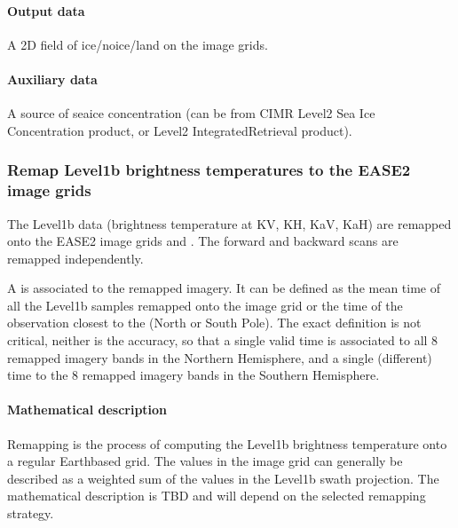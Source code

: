 \documentclass[letterpaper,10pt,english]{jupyterBook}
\begin{document}
\paragraph{Output data}
\label{\detokenize{baseline_algorithm_definition:output-data}}
\sphinxAtStartPar
A 2D field of ice/no\sphinxhyphen{}ice/land on the image grids.


\paragraph{Auxiliary data}
\label{\detokenize{baseline_algorithm_definition:auxiliary-data}}
\sphinxAtStartPar
A source of sea\sphinxhyphen{}ice concentration (can be from CIMR Level\sphinxhyphen{}2 Sea Ice Concentration product, or Level\sphinxhyphen{}2 Integrated\sphinxhyphen{}Retrieval product).


\subsubsection{Remap Level\sphinxhyphen{}1b brightness temperatures to the EASE2 image grids}
\label{\detokenize{baseline_algorithm_definition:remap-level-1b-brightness-temperatures-to-the-ease2-image-grids}}
\sphinxAtStartPar
The Level\sphinxhyphen{}1b data (brightness temperature at K\sphinxhyphen{}V, K\sphinxhyphen{}H, Ka\sphinxhyphen{}V, Ka\sphinxhyphen{}H) are remapped onto the EASE2 image grids  and . The forward and backward scans
are remapped independently.

\sphinxAtStartPar
A  is associated to the remapped imagery. It can be defined as the mean time of all the Level\sphinxhyphen{}1b samples remapped onto the image grid or the time of the observation closest to the (North or South Pole).
The exact definition is not critical, neither is the accuracy, so that a single valid time is associated to all 8 remapped imagery bands in the Northern Hemisphere, and a single (different) time to the 8
remapped imagery bands in the Southern Hemisphere.


\paragraph{Mathematical description}
\label{\detokenize{baseline_algorithm_definition:mathematical-description}}
\sphinxAtStartPar
Remapping is the process of computing the Level\sphinxhyphen{}1b brightness temperature onto a regular Earth\sphinxhyphen{}based grid. The values in the image grid can generally be described as a weighted sum of
the values in the Level\sphinxhyphen{}1b swath projection. The mathematical description is TBD and will depend on the selected remapping strategy.
\end{document}
